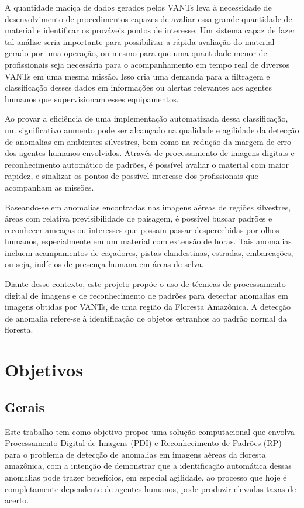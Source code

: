 A quantidade maciça de dados gerados pelos VANTs leva à necessidade de desenvolvimento de procedimentos capazes de avaliar essa grande quantidade de material e identificar os prováveis pontos de interesse. Um sistema capaz de fazer tal análise seria importante para possibilitar a rápida avaliação do material gerado por uma operação, ou mesmo para que uma quantidade menor de profissionais seja necessária para o acompanhamento em tempo real de diversos VANTs em uma mesma missão. Isso cria uma demanda para a filtragem e classificação desses dados em informações ou alertas relevantes aos agentes humanos que supervisionam esses equipamentos.

Ao provar a eficiência de uma implementação automatizada dessa classificação, um significativo aumento pode ser alcançado na qualidade e agilidade da detecção de anomalias em ambientes silvestres, bem como na redução da margem de erro dos agentes humanos envolvidos. Através de processamento de imagens digitais e reconhecimento automático de padrões, é possível avaliar o material com maior rapidez, e sinalizar os pontos de possível interesse dos profissionais que acompanham as missões.

Baseando-se em anomalias encontradas nas imagens aéreas de regiões silvestres, áreas com relativa previsibilidade de paisagem, é possível buscar padrões e reconhecer ameaças ou interesses que possam passar despercebidas por olhos humanos, especialmente em um material com extensão de horas. Tais anomalias incluem acampamentos de caçadores, pistas clandestinas, estradas, embarcações, ou seja, indícios de presença humana em áreas de selva.

Diante desse contexto, este projeto propõe o uso de técnicas de processamento digital de imagens e de reconhecimento de padrões para detectar anomalias em imagens obtidas por VANTs, de uma região da Floresta Amazônica. A detecção de anomalia refere-se à identificação de objetos estranhos ao padrão normal da floresta.

\section{Objetivos}

\subsection{Gerais}

Este trabalho tem como objetivo propor uma solução computacional que envolva Processamento Digital de Imagens (PDI) e Reconhecimento de Padrões (RP) para o problema de detecção de anomalias em imagens aéreas da floresta amazônica, com a intenção de demonstrar que a identificação automática dessas anomalias pode trazer benefícios, em especial agilidade, ao processo que hoje é completamente dependente de agentes humanos, pode produzir elevadas taxas de acerto.

